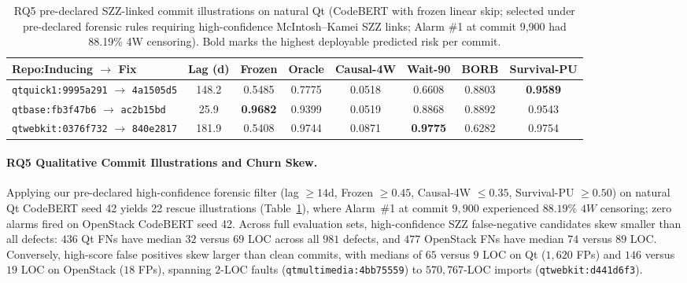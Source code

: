 \documentclass[10pt,a4paper]{article}
\begin{document}
\begin{table}[!htbp]
\centering
\caption{RQ5 pre-declared SZZ-linked commit illustrations on natural Qt (CodeBERT with frozen linear skip; selected under pre-declared forensic rules requiring high-confidence McIntosh--Kamei SZZ links; Alarm \#1 at commit 9,900 had 88.19\% 4W censoring). Bold marks the highest deployable predicted risk per commit.}
\label{tab:rq5_forensics}
\fontsize{7.5}{9.0}\selectfont
\setlength{\tabcolsep}{2.0pt}
\begin{tabular*}{\textwidth}{@{\extracolsep\fill}lccccccc@{}}
\toprule
\textbf{Repo:Inducing $\to$ Fix} & \textbf{Lag (d)} & \textbf{Frozen} & \textbf{Oracle} & \textbf{Causal-4W} & \textbf{Wait-90} & \textbf{BORB} & \textbf{Survival-PU} \\
\midrule
\texttt{qtquick1:9995a291} $\to$ \texttt{4a1505d5} & 148.2 & 0.5485 & 0.7775 & 0.0518 & 0.6608 & 0.8803 & \textbf{0.9589} \\
\texttt{qtbase:fb3f47b6} $\to$ \texttt{ac2b15bd} & 25.9 & \textbf{0.9682} & 0.9399 & 0.0519 & 0.8868 & 0.8892 & 0.9543 \\
\texttt{qtwebkit:0376f732} $\to$ \texttt{840e2817} & 181.9 & 0.5408 & 0.9744 & 0.0871 & \textbf{0.9775} & 0.6282 & 0.9754 \\
\bottomrule
\end{tabular*}
\end{table}

\paragraph{RQ5 Qualitative Commit Illustrations and Churn Skew.}
Applying our pre-declared high-confidence forensic filter (lag $\ge 14\text{d}$, Frozen $\ge 0.45$, Causal-4W $\le 0.35$, Survival-PU $\ge 0.50$) on natural Qt CodeBERT seed 42 yields 22 rescue illustrations (Table~\ref{tab:rq5_forensics}), where Alarm~\#1 at commit $9{,}900$ experienced $88.19\%$ $4W$ censoring; zero alarms fired on OpenStack CodeBERT seed 42. Across full evaluation sets, high-confidence SZZ false-negative candidates skew smaller than all defects: $436$ Qt FNs have median $32$ versus $69$ LOC across all $981$ defects, and $477$ OpenStack FNs have median $74$ versus $89$ LOC. Conversely, high-score false positives skew larger than clean commits, with medians of $65$ versus $9$ LOC on Qt ($1{,}620$ FPs) and $146$ versus $19$ LOC on OpenStack ($18$ FPs), spanning $2$-LOC faults (\texttt{qtmultimedia:4bb75559}) to $570{,}767$-LOC imports (\texttt{qtwebkit:d441d6f3}).


\begingroup\raggedright

\endgroup
\end{document}
